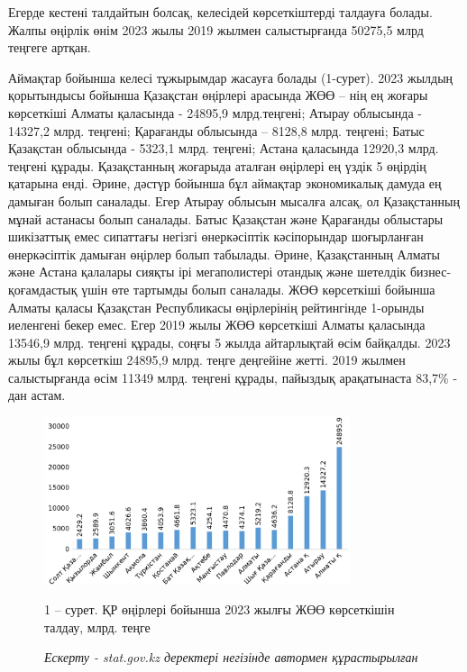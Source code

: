 \begin{multicols}{2}
Егерде кестені талдайтын болсақ, келесідей көрсеткіштерді талдауға
болады. Жалпы өңірлік өнім 2023 жылы 2019 жылмен салыстырғанда 50275,5
млрд теңгеге артқан.

Аймақтар бойынша келесі тұжырымдар жасауға болады (1-сурет). 2023 жылдың
қорытындысы бойынша Қазақстан өңірлері арасында ЖӨӨ -- нің ең жоғары
көрсеткіші Алматы қаласында - 24895,9 млрд.теңгені; Атырау облысында -
14327,2 млрд. теңгені; Қарағанды облысында -- 8128,8 млрд. теңгені;
Батыс Қазақстан облысында - 5323,1 млрд. теңгені; Астана қаласында
12920,3 млрд. теңгені құрады. Қазақстанның жоғарыда аталған өңірлері ең
үздік 5 өңірдің қатарына енді. Әрине, дәстүр бойынша бұл аймақтар
экономикалық дамуда ең дамыған болып саналады. Егер Атырау облысын
мысалға алсақ, ол Қазақстанның мұнай астанасы болып саналады. Батыс
Қазақстан және Қарағанды облыстары шикізаттық емес сипаттағы негізгі
өнеркәсіптік кәсіпорындар шоғырланған өнеркәсіптік дамыған өңірлер болып
табылады. Әрине, Қазақстанның Алматы және Астана қалалары сияқты ірі
мегаполистері отандық және шетелдік бизнес-қоғамдастық үшін өте тартымды
болып саналады. ЖӨӨ көрсеткіші бойынша Алматы қаласы Қазақстан
Республикасы өңірлерінің рейтингінде 1-орынды иеленгені бекер емес. Егер
2019 жылы ЖӨӨ көрсеткіші Алматы қаласында 13546,9 млрд. теңгені құрады,
соңғы 5 жылда айтарлықтай өсім байқалды. 2023 жылы бұл көрсеткіш 24895,9
млрд. теңге деңгейіне жетті. 2019 жылмен салыстырғанда өсім 11349 млрд.
теңгені құрады, пайыздық арақатынаста 83,7\% - дан астам.
\end{multicols}

\begin{figure}[H]
	\centering
	\includegraphics[width=0.8\textwidth]{media/ekon/image1000}
	\caption*{1 -- сурет. ҚР өңірлері бойынша 2023 жылғы ЖӨӨ көрсеткішін
талдау, млрд. теңге}
	\caption*{{\normalfont \emph{Ескерту - stat.gov.kz деректері негізінде автормен құрастырылған}}}
\end{figure}

